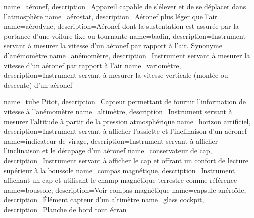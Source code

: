 {
    name=aéronef,
    description={Appareil capable de s'élever et de se déplacer dans l'atmosphère}
}
{
    name=aérostat,
    description={Aéronef plus léger que l'air}
}
{
    name=aérodyne,
    description={Aéronef dont la sustentation est assurée par la portance d'une voilure fixe ou tournante}
}
{
    name=badin,
    description={Instrument servant à mesurer la vitesse d'un aéronef par rapport à l'air. Synonyme d'anémomètre}
}
{
    name=anémomètre,
    description={Instrument servant à mesurer la vitesse d'un aéronef par rapport à l'air}
}
{
    name=variomètre,
    description={Instrument servant à mesurer la vitesse verticale (montée ou descente) d'un aéronef}
}

{
    name=tube Pitot,
    description={Capteur permettant de fournir l'information de vitesse à l'anémomètre}
}
{
    name=altimètre,
    description={Instrument servant à mesurer l'altitude à partir de la pression atmosphérique}
}
{
    name=horizon artificiel,
    description={Instrument servant à afficher l'assiette et l'inclinaison d'un aéronef}
}
{
    name=indicateur de virage,
    description={Instrument servant à afficher l'inclinaison et le dérapage d'un aéronef}
}
{
    name=conservateur de cap,
    description={Instrument servant à afficher le cap et offrant un confort de lecture supérieur à la boussole}
}
{
    name=compas magnétique,
    description={Instrument affichant un cap et utilisant le champ magnétique terrestre comme référence}
}
{
    name=boussole,
    description={Voir compas magnétique}
}
{
    name=capsule anéroïde,
    description={Élément capteur d'un altimètre}
}
{
    name=glass cockpit,
    description={Planche de bord tout écran}
}






